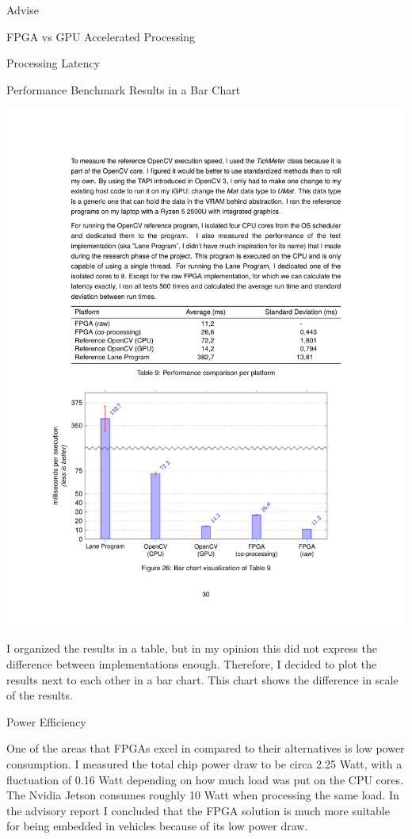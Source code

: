 \documentclass{matthijs}
\begin{document}
\begin{hoofdstuk}{Advise}
\begin{paragraaf}{FPGA vs GPU Accelerated Processing}
\begin{subparagraaf}{Processing Latency}
				\begin{figuur}{Performance Benchmark Results in a Bar Chart}
					\centerline{
						\includegraphics[clip, trim=2.5cm 3.6cm 2.5cm 15.2cm]{benchmarks.pdf}
					}
				\end{figuur}	
				\vspace{-1ex}

				\noindent I organized the results in a table, but in my opinion this did not express the difference between implementations enough.
				Therefore, I decided to plot the results next to each other in a bar chart.
				This chart shows the difference in scale of the results.

			\end{subparagraaf}

			\begin{subparagraaf}{Power Efficiency}

				One of the areas that FPGAs excel in compared to their alternatives is low power consumption.
				I measured the total chip power draw to be circa 2.25 Watt, with a fluctuation of 0.16 Watt depending on how much load was put on the CPU cores.
				The Nvidia Jetson consumes roughly 10 Watt when processing the same load.
				In the advisory report I concluded that the FPGA solution is much more suitable for being embedded in vehicles because of its low power draw.


\end{subparagraaf}
\end{paragraaf}
\end{hoofdstuk}
\end{document}
